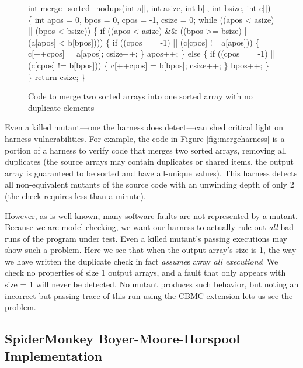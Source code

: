 \documentclass{svjour3}
\begin{document}
\begin{figure}
{%
\begin{code}
int merge\_sorted\_nodups(int a[], int asize, 
                        int b[], int bsize, int c[]) \{
  int apos = 0, bpos = 0, cpos = -1, csize = 0;
  while ((apos < asize) || (bpos < bsize)) \{
    if ((apos < asize) \&\& 
        ((bpos >= bsize) || (a[apos] < b[bpos]))) \{
      if ((cpos == -1) || (c[cpos] != a[apos])) \{
	c[++cpos] = a[apos];
	csize++;
      \}
      apos++;
    \} else \{
      if ((cpos == -1) || (c[cpos] != b[bpos])) \{
	c[++cpos] = b[bpos];
	csize++;
      \}
      bpos++;      
    \}
  \}
  return csize;
\}
\end{code}
}
\caption{Code to merge two sorted arrays into one sorted array with no
  duplicate elements}
\label{fig:sortnodup}
\end{figure}


Even a killed mutant---one the harness does detect---can shed
critical light on harness vulnerabilities.  For example, the code in
Figure \ref{fig:mergeharness} is a portion of a harness to verify
code that merges two sorted arrays, removing all duplicates (the
source arrays may contain duplicates or shared items, the output array
is guaranteed to be sorted and have all-unique values).  This harness
detects all non-equivalent mutants of the source code with an
unwinding depth of only 2 (the check requires less than a minute).

However, as is
well known, many software faults \cite{justmutants} are not
represented by a mutant.  Because we are model checking, we want our
harness to actually rule out \emph{all} bad runs of the program under
test.  Even a killed mutant's passing executions may show such a
problem.  Here we see that when the output array's size is 1, the way
we have written the duplicate check in fact \emph{assume}s away
\emph{all executions}!  We check no properties of size 1 output
arrays, and a fault that only appears with size = 1 will never be
detected.  No mutant produces such behavior, but noting an incorrect
but passing trace of this run using the CBMC extension lets us see the problem.

\subsection{SpiderMonkey Boyer-Moore-Horspool Implementation}
\end{document}
